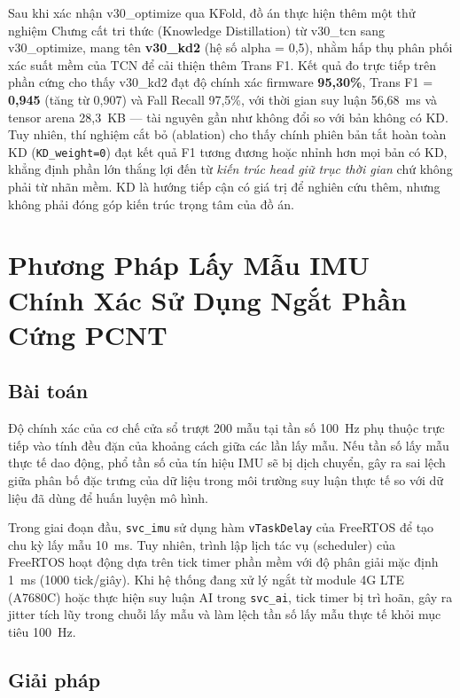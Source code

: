 \documentclass[../DoAn.tex]{subfiles}
\begin{document}
Sau khi xác nhận v30\_optimize qua KFold, đồ án thực hiện thêm một thử nghiệm Chưng cất tri thức (Knowledge Distillation) từ v30\_tcn sang v30\_optimize, mang tên \textbf{v30\_kd2} (hệ số alpha = 0,5), nhằm hấp thụ phân phối xác suất mềm của TCN để cải thiện thêm Trans F1. Kết quả đo trực tiếp trên phần cứng cho thấy v30\_kd2 đạt độ chính xác firmware \textbf{95,30\%}, Trans F1 = \textbf{0,945} (tăng từ 0,907) và Fall Recall 97,5\%, với thời gian suy luận 56,68~ms và tensor arena 28,3~KB --- tài nguyên gần như không đổi so với bản không có KD. Tuy nhiên, thí nghiệm cắt bỏ (ablation) cho thấy chính phiên bản tắt hoàn toàn KD (\texttt{KD\_weight=0}) đạt kết quả F1 tương đương hoặc nhỉnh hơn mọi bản có KD, khẳng định phần lớn thắng lợi đến từ \textit{kiến trúc head giữ trục thời gian} chứ không phải từ nhãn mềm. KD là hướng tiếp cận có giá trị để nghiên cứu thêm, nhưng không phải đóng góp kiến trúc trọng tâm của đồ án.


\section{Phương Pháp Lấy Mẫu IMU Chính Xác Sử Dụng Ngắt Phần Cứng PCNT}

\subsection{Bài toán}

Độ chính xác của cơ chế cửa sổ trượt 200 mẫu tại tần số 100~Hz phụ thuộc trực tiếp vào tính đều đặn của khoảng cách giữa các lần lấy mẫu. Nếu tần số lấy mẫu thực tế dao động, phổ tần số của tín hiệu IMU sẽ bị dịch chuyển, gây ra sai lệch giữa phân bố đặc trưng của dữ liệu trong môi trường suy luận thực tế so với dữ liệu đã dùng để huấn luyện mô hình.

Trong giai đoạn đầu, \texttt{svc\_imu} sử dụng hàm \texttt{vTaskDelay} của FreeRTOS để tạo chu kỳ lấy mẫu 10~ms. Tuy nhiên, trình lập lịch tác vụ (scheduler) của FreeRTOS hoạt động dựa trên tick timer phần mềm với độ phân giải mặc định 1~ms (1000 tick/giây). Khi hệ thống đang xử lý ngắt từ module 4G LTE (A7680C) hoặc thực hiện suy luận AI trong \texttt{svc\_ai}, tick timer bị trì hoãn, gây ra jitter tích lũy trong chuỗi lấy mẫu và làm lệch tần số lấy mẫu thực tế khỏi mục tiêu 100~Hz.

\subsection{Giải pháp}
\end{document}
